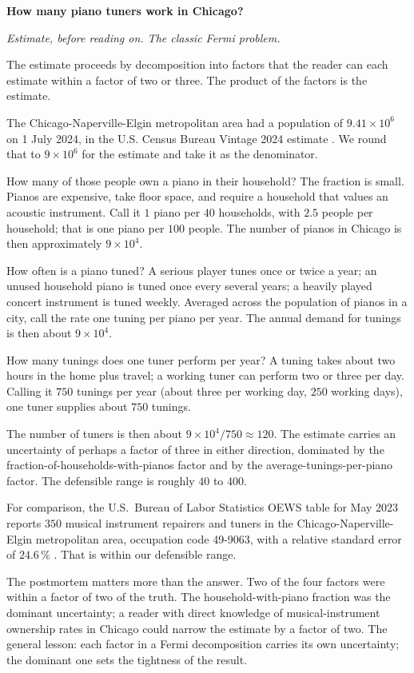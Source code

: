 \begin{estimation}
\textbf{How many piano tuners work in Chicago?}

\smallskip
\textit{Estimate, before reading on. The classic Fermi problem.}

\smallskip
The estimate proceeds by decomposition into factors that the reader can
each estimate within a factor of two or three. The product of the
factors is the estimate.

The Chicago-Naperville-Elgin metropolitan area had a population of
$9.41 \times 10^{6}$ on 1 July 2024, in the U.S. Census Bureau Vintage
2024 estimate \cite{data:census-cbsa-2024}. We round that to $9 \times
10^{6}$ for the estimate and take it as the denominator.

How many of those people own a piano in their household? The fraction is
small. Pianos are expensive, take floor space, and require a household
that values an acoustic instrument. Call it $1$ piano per $40$
households, with $2.5$ people per household; that is one piano per
$100$ people. The number of pianos in Chicago is then approximately
$9 \times 10^{4}$.

How often is a piano tuned? A serious player tunes once or twice a year;
an unused household piano is tuned once every several years; a heavily
played concert instrument is tuned weekly. Averaged across the
population of pianos in a city, call the rate one tuning per piano per
year. The annual demand for tunings is then about $9 \times 10^{4}$.

How many tunings does one tuner perform per year? A tuning takes about
two hours in the home plus travel; a working tuner can perform two or
three per day. Calling it $750$ tunings per year (about three per
working day, $250$ working days), one tuner supplies about $750$
tunings.

The number of tuners is then about $9 \times 10^{4} / 750 \approx 120$.
The estimate carries an uncertainty of perhaps a factor of three in
either direction, dominated by the fraction-of-households-with-pianos
factor and by the average-tunings-per-piano factor. The defensible
range is roughly $40$ to $400$.

For comparison, the U.S.~Bureau of Labor Statistics OEWS table for May
2023 reports $350$ musical instrument repairers and tuners in the
Chicago-Naperville-Elgin metropolitan area, occupation code 49-9063,
with a relative standard error of $24.6\,\%$
\cite{data:bls-oews-2023-chicago}. That is within our defensible range.

The postmortem matters more than the answer. Two of the four factors
were within a factor of two of the truth. The household-with-piano
fraction was the dominant uncertainty; a reader with direct knowledge
of musical-instrument ownership rates in Chicago could narrow the
estimate by a factor of two. The general lesson: each factor in a
Fermi decomposition carries its own uncertainty; the dominant one sets
the tightness of the result.
\end{estimation}

